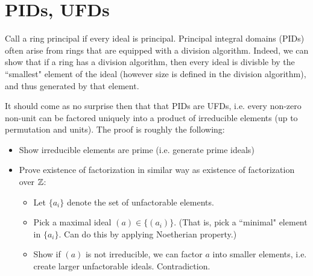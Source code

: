 \section{PIDs, UFDs}
Call a ring principal if every ideal is principal. Principal integral domains (PIDs) often arise from rings that are equipped with a division algorithm. Indeed, we can show that if a ring has a division algorithm, then every ideal is divisble by the ``smallest" element of the ideal (however size is defined in the division algorithm), and thus generated by that element.

It should come as no surprise then that that PIDs are UFDs, i.e. every non-zero non-unit can be factored uniquely into a product of irreducible elements (up to permutation and units). The proof is roughly the following:
\begin{itemize}
    \item Show irreducible elements are prime (i.e. generate prime ideals)
    \item Prove existence of factorization in similar way as existence of factorization over ${\mathbb Z}$:
        \begin{itemize}
            \item Let $\{a_i\}$ denote the set of unfactorable elements.
            \item Pick a maximal ideal $(a) \in \{(a_i)\}$. (That is, pick a ``minimal" element in $\{a_i\}$. Can do this by applying Noetherian property.)
            \item Show if $(a)$ is not irreducible, we can factor $a$ into smaller elements, i.e. create larger unfactorable ideals. Contradiction.
        \end{itemize}
\end{itemize}

